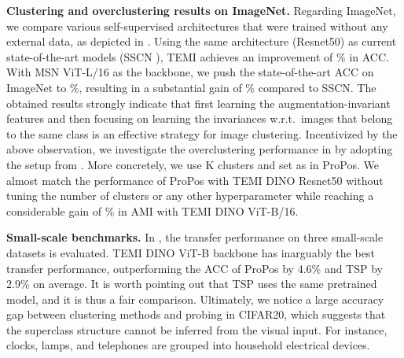 \documentclass{bmvc2k}
\begin{document}
\textbf{Clustering and overclustering results on ImageNet.} Regarding ImageNet, we compare various self-supervised architectures that were trained without any external data, as depicted in . Using the same architecture (Resnet50) as current state-of-the-art models (SSCN \cite{sscn}), TEMI achieves an improvement of \% in ACC. With MSN ViT-L/16 as the backbone, we push the state-of-the-art ACC on ImageNet to \%, resulting in a substantial gain of \% compared to SSCN. The obtained results strongly indicate that first learning the augmentation-invariant features and then focusing on learning the invariances w.r.t.\ images that belong to the same class is an effective strategy for image clustering. Incentivized by the above observation, we investigate the overclustering performance in  by adopting the setup from \cite{pcl}. More concretely, we use K clusters and set  as in ProPos. We almost match the performance of ProPos \cite{propos} with TEMI DINO Resnet50 without tuning the number of clusters or any other hyperparameter while reaching a considerable gain of \% in AMI with TEMI DINO ViT-B/16.


\textbf{Small-scale benchmarks.} In , the transfer performance on three small-scale datasets is evaluated. TEMI DINO ViT-B backbone has inarguably the best transfer performance, outperforming the ACC of ProPos by 4.6\% and TSP by 2.9\% on average. It is worth pointing out that TSP \cite{tsp} uses the same pretrained model, and it is thus a fair comparison. Ultimately, we notice a large accuracy gap between clustering methods and probing in CIFAR20, which suggests that the superclass structure cannot be inferred from the visual input. For instance, clocks, lamps, and telephones are grouped into household electrical devices.
\end{document}
